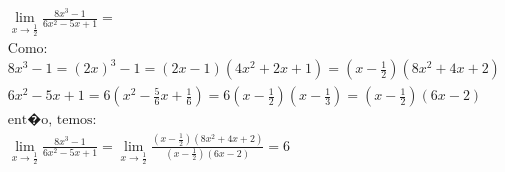 \begin{ex}
\begin{align}
&\lim_{x\rightarrow \frac{1}{2}} \frac{8x^3-1}{6x^2-5x+1}=\nonumber\\
&\text{Como:}\nonumber\\
&8x^3-1=(2x)^3-1=(2x-1)(4x^2+2x+1)=(x-\frac{1}{2})(8x^2+4x+2)\nonumber\\
&6x^2-5x+1=6(x^2-\frac{5}{6}x+\frac{1}{6})=6(x-\frac{1}{2})(x-\frac{1}{3})=(x-\frac{1}{2})(6x-2)\nonumber\\
&\text{ent�o, temos:}\nonumber\\
&\lim_{x\rightarrow \frac{1}{2}} \frac{8x^3-1}{6x^2-5x+1}=\lim_{x\rightarrow \frac{1}{2}} \frac{(x-\frac{1}{2})(8x^2+4x+2)}{(x-\frac{1}{2})(6x-2)}=6\nonumber
\end{align}
\end{ex}